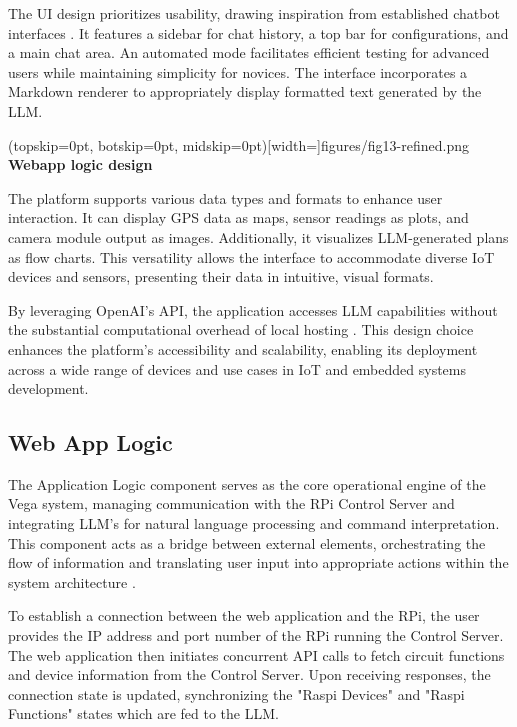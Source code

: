 \documentclass{ieeeaccess}
\begin{document}
The UI design prioritizes usability, drawing inspiration from established chatbot interfaces \cite{OpenAI_GPT}. It features a sidebar for chat history, a top bar for configurations, and a main chat area. An automated mode facilitates efficient testing for advanced users while maintaining simplicity for novices. The interface incorporates a Markdown renderer to appropriately display formatted text generated by the LLM.

\Figure[t!](topskip=0pt, botskip=0pt,
midskip=0pt)[width=\textwidth]{{figures/fig13-refined.png}}
{ \textbf{Webapp logic design}\label{fig5}}

The platform supports various data types and formats to enhance user interaction. It can display GPS data as maps, sensor readings as plots, and camera module output as images. Additionally, it visualizes LLM-generated plans as flow charts. This versatility allows the interface to accommodate diverse IoT devices and sensors, presenting their data in intuitive, visual formats.

By leveraging OpenAI's API, the application accesses LLM capabilities without the substantial computational overhead of local hosting \cite{kim2024llmemestimatinggpumemory}. This design choice enhances the platform's accessibility and scalability, enabling its deployment across a wide range of devices and use cases in IoT and embedded systems development.


\subsection{Web App Logic}
The Application Logic component serves as the core operational engine of the Vega system, managing communication with the RPi Control Server and integrating LLM's for natural language processing and command interpretation. This component acts as a bridge between external elements, orchestrating the flow of information and translating user input into appropriate actions within the system architecture \cite{bass2003software}.

To establish a connection between the web application and the RPi, the user provides the IP address and port number of the RPi running the Control Server. The web application then initiates concurrent API calls to fetch circuit functions and device information from the Control Server. Upon receiving responses, the connection state is updated, synchronizing the "Raspi Devices" and "Raspi Functions" states which are fed to the LLM.
\end{document}
